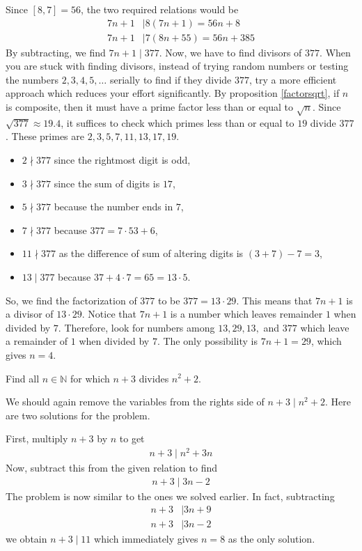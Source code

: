 \documentclass{subfile}
\begin{document}
		\begin{solution}
			Since $[8,7]=56$, the two required relations would be
				\begin{align*}
					7n+1 & \mid 8(7n+1)=56n+8\\
					7n+1 & \mid 7(8n+55)=56n+385
				\end{align*}
			By subtracting, we find $7n+1\mid 377$. Now, we have to find divisors of $377$. When you are stuck with finding divisors, instead of trying random numbers or testing the numbers $2,3,4,5,\ldots$ serially to find if they divide $377$, try a more efficient approach which reduces your effort significantly. By proposition \eqref{factorsqrt}, if $n$ is composite, then it must have a prime factor less than or equal to $\sqrt{n}$.  Since $\sqrt{377} \approx 19.4$, it suffices to check which primes less than or equal to $19$ divide $377$. These primes are $2,3,5,7,11,13,17,19$.
				\begin{itemize}
					\item $2 \nmid 377$ since the rightmost digit is odd,
					\item $3 \nmid 377$ since the sum of digits is $17$,
					\item $5 \nmid 377$ because the number ends in $7$,
					\item $7 \nmid 377$ because $377=7\cdot53+6$,
					\item $11 \nmid 377$ as the difference of sum of altering digits is $(3+7)-7=3$,
					\item $13 \mid 377$ because $37 + 4 \cdot 7 = 65 = 13 \cdot 5$.
				\end{itemize}
			So, we find the factorization of $377$ to be $377=13 \cdot 29$. This means that $7n+1$ is a divisor of $13 \cdot 29$. Notice that $7n+1$ is a number which leaves remainder $1$ when divided by $7$. Therefore, look for numbers among $13, 29, 13, $ and $377$ which leave a remainder of $1$ when divided by $7$. The only possibility is $7n+1=29$, which gives $n=4$.
		\end{solution}

		\begin{problem}\label{prob:n+3|n^2+2}
			Find all $n\in\mathbb{N}$ for which $n+3$ divides $n^2+2$.
		\end{problem}
	We should again remove the variables from the rights side of $n+3\mid n^2+2$. Here are two solutions for the problem.
		\begin{solution}
			 First, multiply $n+3$ by $n$ to get
				\begin{align*}
					n+3 \mid n^2+3n
				\end{align*}
			Now, subtract this from the given relation to find
				\begin{align*}
					n+3 \mid 3n-2
				\end{align*}
			The problem is now similar to the ones we solved earlier. In fact, subtracting
				\begin{align*}
					n+3
						& \mid 3n+9\\
					n+3
						& \mid 3n-2
				\end{align*}
			we obtain $n+3\mid 11$ which immediately gives $n=8$ as the only solution.
		\end{solution}
\end{document}

